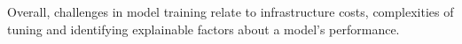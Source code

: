 
Overall, challenges in model training relate to infrastructure costs, complexities of tuning and identifying explainable factors about a model's performance. 

